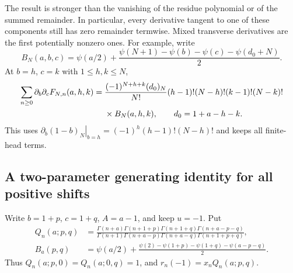 The result is stronger than the vanishing of the residue polynomial
or of the summed remainder. In particular, every derivative tangent
to one of these components still has zero remainder termwise.
Mixed transverse derivatives are the first potentially nonzero ones.
For example, write
\[
 B_N(a,b,c)=\psi(a/2)+
 \frac{\psi(N+1)-\psi(b)-\psi(c)-\psi(d_0+N)}2.
\]
At $b=h$, $c=k$ with $1\leq h,k\leq N$,
\begin{align}
 \sum_{n\geq0}\partial_b\partial_cF_{N,n}(a,h,k)
 ={}&\frac{(-1)^{N+h+k}(d_0)_N}{N!}
 (h-1)!(N-h)!(k-1)!(N-k)!\notag\\
 &\times B_N(a,h,k),\qquad d_0=1+a-h-k.
 \label{dg:grid-first-mixed}
\end{align}
This uses $\left.\partial_b(1-b)_N\right|_{b=h}
=(-1)^h(h-1)!(N-h)!$ and keeps all finite-head terms.

\subsection{A two-parameter generating identity for all positive shifts}

Write $b=1+p$, $c=1+q$, $A=a-1$, and keep $u=-1$. Put
\begin{align}
 Q_n(a;p,q)
 &=\frac{\Gamma(n+a)\Gamma(n+1+p)\Gamma(n+1+q)
                         \Gamma(n+a-p-q)}
 {\Gamma(n+1)\Gamma(n+a-p)\Gamma(n+a-q)
                         \Gamma(n+1+p+q)},\label{dg:Q}\\
 B_a(p,q)&=\psi(a/2)+\frac{\psi(2)-\psi(1+p)-\psi(1+q)
                                      -\psi(a-p-q)}2.
 \label{dg:B}
\end{align}
Thus $Q_n(a;p,0)=Q_n(a;0,q)=1$, and $r_n(-1)=x_nQ_n(a;p,q)$.

